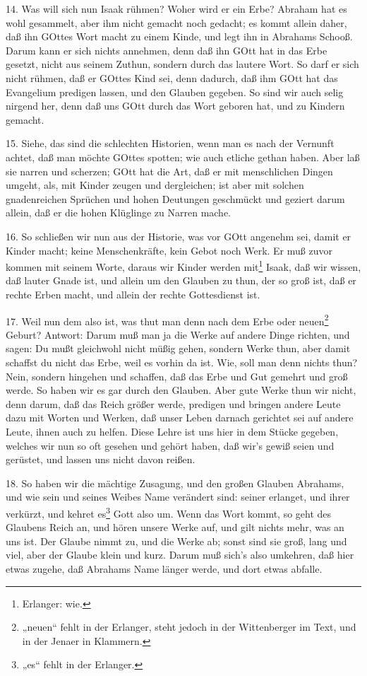 14. Was will sich nun Isaak rühmen? Woher wird er ein Erbe? Abraham hat es wohl gesammelt, aber ihm nicht gemacht noch gedacht; es kommt allein daher, daß ihn GOttes Wort macht zu einem Kinde, und legt ihn in Abrahams Schooß. Darum kann er sich nichts annehmen, denn daß ihn GOtt hat in das Erbe gesetzt, nicht aus seinem Zuthun, sondern durch das lautere Wort. So darf er sich nicht rühmen, daß er GOttes Kind sei, denn dadurch, daß ihm GOtt hat das Evangelium predigen lassen, und den Glauben gegeben. So sind wir auch selig nirgend her, denn daß uns GOtt durch das Wort geboren hat, und zu Kindern gemacht.

15. Siehe, das sind die schlechten Historien, wenn man es nach der Vernunft achtet, daß man möchte GOttes spotten; wie auch etliche gethan haben. Aber laß sie narren und scherzen; GOtt hat die Art, daß er mit menschlichen Dingen umgeht, als, mit Kinder zeugen und dergleichen; ist aber mit solchen gnadenreichen Sprüchen und hohen Deutungen geschmückt und geziert darum allein, daß er die hohen Klüglinge zu Narren mache.

16. So schließen wir nun aus der Historie, was vor GOtt angenehm sei, damit er Kinder macht; keine Menschenkräfte, kein Gebot noch Werk. Er muß zuvor kommen mit seinem Worte, daraus wir Kinder werden mit\footnote{Erlanger: wie.} Isaak, daß wir wissen, daß lauter Gnade ist, und allein um den Glauben zu thun, der so groß ist, daß er rechte Erben macht, und allein der rechte Gottesdienst ist.

17. Weil nun dem also ist, was thut man denn nach dem Erbe oder neuen\footnote{„neuen“ fehlt in der Erlanger, steht jedoch in der Wittenberger im Text, und in der Jenaer in Klammern.} Geburt? Antwort: Darum muß man ja die Werke auf andere Dinge richten, und sagen: Du mußt gleichwohl nicht müßig gehen, sondern Werke thun, aber damit schaffst du nicht das Erbe, weil es vorhin da ist. Wie, soll man denn nichts thun? Nein, sondern hingehen und schaffen, daß das Erbe und Gut gemehrt und groß werde. So haben wir es gar durch den Glauben. Aber gute Werke thun wir nicht, denn darum, daß
das Reich größer werde, predigen und bringen andere Leute dazu mit Worten und Werken, daß unser Leben darnach gerichtet sei auf andere Leute, ihnen auch zu helfen. Diese Lehre ist uns hier in dem Stücke gegeben, welches wir nun so oft gesehen und gehört haben, daß wir’s gewiß seien und gerüstet, und lassen uns nicht davon reißen.

18. So haben wir die mächtige Zusagung, und den großen Glauben Abrahams, und wie sein und seines Weibes Name verändert sind: seiner erlanget, und ihrer verkürzt, und kehret es\footnote{„es“ fehlt in der Erlanger.} Gott also um. Wenn das Wort kommt, so geht des Glaubens Reich an, und hören unsere Werke auf, und gilt nichts mehr, was an uns ist. Der Glaube nimmt zu, und die Werke ab; sonst sind sie groß, lang und viel, aber der Glaube klein und kurz. Darum muß sich’s also umkehren, daß hier etwas zugehe, daß Abrahams Name länger werde, und dort etwas abfalle.

